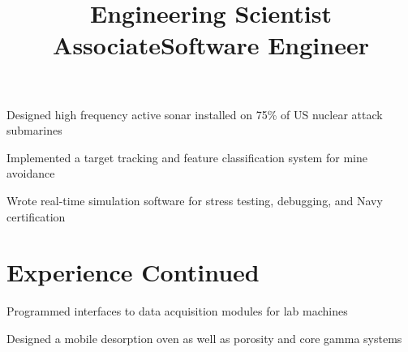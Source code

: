 \documentclass[12pt, tweaklist, line]{res}
\let\tempone\itemize
\let\temptwo\enditemize
\renewenvironment{itemize}{\tempone\vspace{-.15in}\setlength{\topsep}{0pt}\setlength{\itemsep}{3pt}\vspace{-.15in}}{\temptwo}
\def\Cplusplus{{\rm C\raise.5ex\hbox{\small ++}}}
\begin{document}
\begin{resume}
\title{Engineering Scientist Associate} %
\begin{position}
\begin{itemize}
\item Designed high frequency active sonar installed on 75\% of US nuclear attack submarines
\item Implemented a target tracking and feature classification system for mine avoidance
\item Wrote real-time simulation software for stress testing, debugging, and Navy certification
\end{itemize}
\end{position}

\pagebreak

\vspace{-.17in}
\vtop{\hspace{-.55in} \hsize=6.9in \hrulefill}

\section{Experience Continued}

\title{Software Engineer}
\begin{position}
\begin{itemize}
\item Programmed interfaces to data acquisition modules for lab machines
\item Designed a mobile desorption oven as well as porosity and core gamma systems
\end{itemize}
\end{position}


\end{resume}
\end{document}
